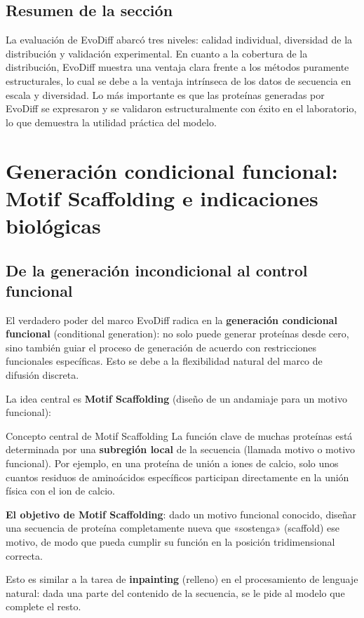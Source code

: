 \documentclass[a4paper]{article}
\begin{document}
\subsection{Resumen de la sección}

La evaluación de EvoDiff abarcó tres niveles: calidad individual, diversidad de la distribución y validación experimental. En cuanto a la cobertura de la distribución, EvoDiff muestra una ventaja clara frente a los métodos puramente estructurales, lo cual se debe a la ventaja intrínseca de los datos de secuencia en escala y diversidad. Lo más importante es que las proteínas generadas por EvoDiff se expresaron y se validaron estructuralmente con éxito en el laboratorio, lo que demuestra la utilidad práctica del modelo.

\section{Generación condicional funcional: Motif Scaffolding e indicaciones biológicas}

\subsection{De la generación incondicional al control funcional}

El verdadero poder del marco EvoDiff radica en la \textbf{generación condicional funcional} (conditional generation): no solo puede generar proteínas desde cero, sino también guiar el proceso de generación de acuerdo con restricciones funcionales específicas. Esto se debe a la flexibilidad natural del marco de difusión discreta.

La idea central es \textbf{Motif Scaffolding} (diseño de un andamiaje para un motivo funcional):

\begin{importantbox}{Concepto central de Motif Scaffolding}
La función clave de muchas proteínas está determinada por una \textbf{subregión local} de la secuencia (llamada motivo o motivo funcional). Por ejemplo, en una proteína de unión a iones de calcio, solo unos cuantos residuos de aminoácidos específicos participan directamente en la unión física con el ion de calcio.

\textbf{El objetivo de Motif Scaffolding}: dado un motivo funcional conocido, diseñar una secuencia de proteína completamente nueva que «sostenga» (scaffold) ese motivo, de modo que pueda cumplir su función en la posición tridimensional correcta.

Esto es similar a la tarea de \textbf{inpainting} (relleno) en el procesamiento de lenguaje natural: dada una parte del contenido de la secuencia, se le pide al modelo que complete el resto.
\end{importantbox}
\end{document}
